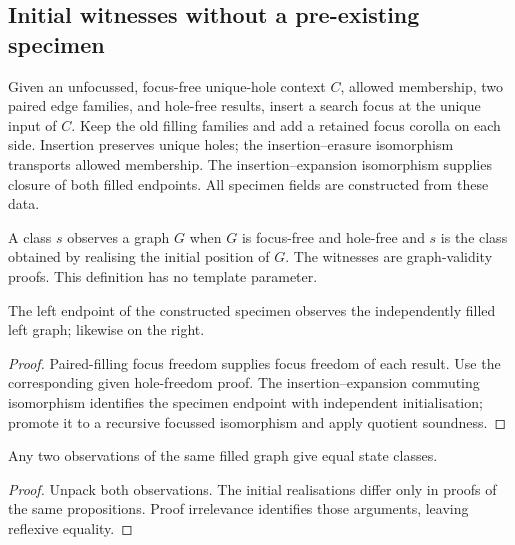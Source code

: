 \subsection{Initial witnesses without a pre-existing specimen}
\begin{definition}
Given an unfocussed, focus-free unique-hole context $C$, allowed membership, two paired edge families, and hole-free results, insert a search focus at the unique input of $C$. Keep the old filling families and add a retained focus corolla on each side. Insertion preserves unique holes; the insertion--erasure isomorphism transports allowed membership. The insertion--expansion isomorphism supplies closure of both filled endpoints. All specimen fields are constructed from these data.
\end{definition}

\begin{definition}
A class $s$ observes a graph $G$ when $G$ is focus-free and hole-free and $s$ is the class obtained by realising the initial position of $G$. The witnesses are graph-validity proofs. This definition has no template parameter.
\end{definition}

\begin{lemma}
The left endpoint of the constructed specimen observes the independently filled left graph; likewise on the right.
\end{lemma}
\begin{proof}
Paired-filling focus freedom supplies focus freedom of each result. Use the corresponding given hole-freedom proof. The insertion--expansion commuting isomorphism identifies the specimen endpoint with independent initialisation; promote it to a recursive focussed isomorphism and apply quotient soundness.
\end{proof}

\begin{lemma}
Any two observations of the same filled graph give equal state classes.
\end{lemma}
\begin{proof}
Unpack both observations. The initial realisations differ only in proofs of the same propositions. Proof irrelevance identifies those arguments, leaving reflexive equality.
\end{proof}

